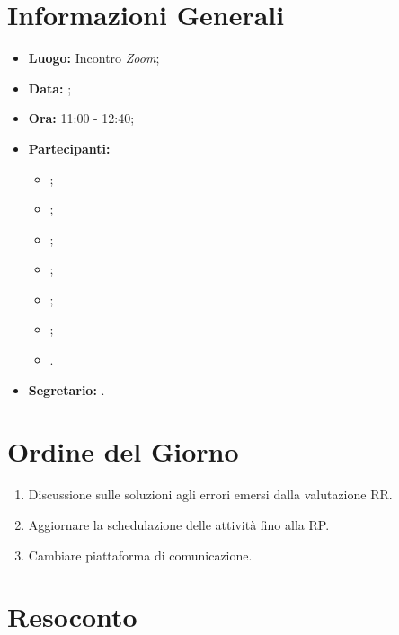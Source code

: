 \section{Informazioni Generali}
\begin{itemize}
\item \textbf{Luogo:} Incontro \textit{Zoom};
\item \textbf{Data:} \Data;
\item \textbf{Ora:} 11:00 - 12:40;
\item \textbf{Partecipanti:}
	\begin{itemize}
		\item \BL{}; 
		\item \FF{};
		\item \MM{}; 
		\item \PC{};
		\item \TG{};
		\item \TL{};
		\item \VD{}.
	\end{itemize} 
\item \textbf{Segretario:} \TL{}.
\end{itemize}

\section{Ordine del Giorno}
\begin{enumerate}
 \item Discussione sulle soluzioni agli errori emersi dalla valutazione RR.
 \item Aggiornare la schedulazione delle attività fino alla RP. 
 \item Cambiare piattaforma di comunicazione.
\end{enumerate}

\section{Resoconto}
